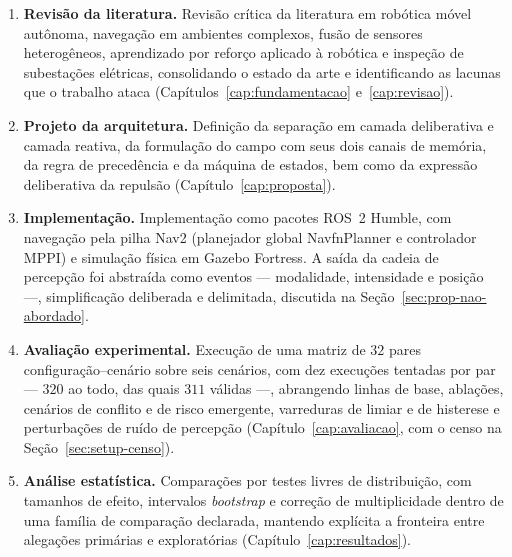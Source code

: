\begin{enumerate}
    \item \textbf{Revisão da literatura.} Revisão crítica da
    literatura em robótica móvel autônoma, navegação em ambientes complexos, fusão
    de sensores heterogêneos, aprendizado por reforço aplicado à robótica e inspeção
    de subestações elétricas, consolidando o estado da arte e identificando as
    lacunas que o trabalho ataca (Capítulos~\ref{cap:fundamentacao}
    e~\ref{cap:revisao}).

    \item \textbf{Projeto da arquitetura.} Definição da separação em camada
    deliberativa e camada reativa, da formulação do campo com seus dois canais de
    memória, da regra de precedência e da máquina de estados, bem como da expressão
    deliberativa da repulsão (Capítulo~\ref{cap:proposta}).

    \item \textbf{Implementação.} Implementação como pacotes ROS~2 Humble, com
    navegação pela pilha Nav2 (planejador global NavfnPlanner e controlador MPPI) e
    simulação física em Gazebo Fortress. A saída da cadeia de percepção foi
    abstraída como eventos --- modalidade, intensidade e posição ---, simplificação
    deliberada e delimitada, discutida na Seção~\ref{sec:prop-nao-abordado}.

    \item \textbf{Avaliação experimental.} Execução de uma matriz de $32$ pares
    configuração--cenário sobre seis cenários, com dez execuções tentadas por par ---
    $320$ ao todo, das quais $311$ válidas ---, abrangendo linhas de base, ablações,
    cenários de conflito e de risco emergente, varreduras de limiar e de histerese e
    perturbações de ruído de percepção (Capítulo~\ref{cap:avaliacao}, com o censo na
    Seção~\ref{sec:setup-censo}).

    \item \textbf{Análise estatística.} Comparações por testes livres de
    distribuição, com tamanhos de efeito, intervalos \textit{bootstrap} e correção
    de multiplicidade dentro de uma família de comparação declarada, mantendo
    explícita a fronteira entre alegações primárias e exploratórias
    (Capítulo~\ref{cap:resultados}).
\end{enumerate}

